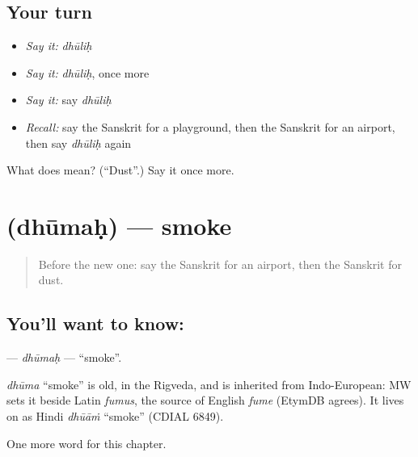 \subsection*{Your turn}
\begin{itemize}
\raggedright
  \item \emph{Say it:} \emph{dhūliḥ}
  \item \emph{Say it:} \emph{dhūliḥ}, once more
  \item \emph{Say it:} say \emph{dhūliḥ}
  \item \emph{Recall:} say the Sanskrit for a playground, then the Sanskrit for an airport, then say \emph{dhūliḥ} again
\end{itemize}

\begin{tcolorbox}[breakable,colback=teal!4,colframe=teal!35!black,title={Before you move on}]
What does  mean? (\textquotedblleft{}Dust\textquotedblright{}.) Say it once more.
\end{tcolorbox}
\section[\texorpdfstring{\sk{धूमः} (dhūmaḥ)}{धूमः (dhūmaḥ)}]{ (dhūmaḥ) — smoke}

\label{lesson:SA-C165-dhumah}



\begin{quote}
Before the new one: say the Sanskrit for an airport, then the Sanskrit for dust.
\end{quote}

\subsection*{You'll want to know: }
\textbf{} — \emph{dhūmaḥ} — \textquotedblleft{}smoke\textquotedblright{}.

\begin{cousinweb}
\emph{dhūma} \textquotedblleft{}smoke\textquotedblright{} is old, in the Rigveda, and is inherited from Indo-European: MW sets it beside Latin \emph{fumus}, the source of English \emph{fume} (EtymDB agrees). It lives on as Hindi \emph{dhūāṁ} \textquotedblleft{}smoke\textquotedblright{} (CDIAL 6849).
\end{cousinweb}

\begin{grammarlens}[title={What you've built}]
One more word for this chapter.
\end{grammarlens}

